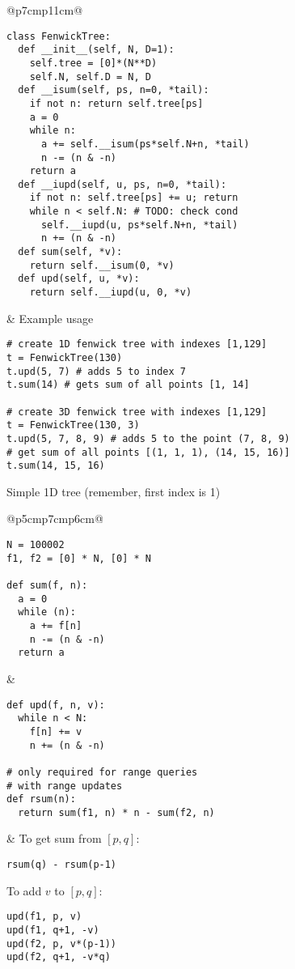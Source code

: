 \documentclass[letterpaper]{article}
\begin{document}
\begin{tabular}{@{}p{7cm}p{11cm}@{}}
    \vspace*{-1em}
    \begin{lstlisting}
class FenwickTree:
  def __init__(self, N, D=1):
    self.tree = [0]*(N**D)
    self.N, self.D = N, D
  def __isum(self, ps, n=0, *tail):
    if not n: return self.tree[ps]
    a = 0
    while n:
      a += self.__isum(ps*self.N+n, *tail)
      n -= (n & -n)
    return a
  def __iupd(self, u, ps, n=0, *tail):
    if not n: self.tree[ps] += u; return
    while n < self.N: # TODO: check cond
      self.__iupd(u, ps*self.N+n, *tail)
      n += (n & -n)
  def sum(self, *v):
    return self.__isum(0, *v)
  def upd(self, u, *v):
    return self.__iupd(u, 0, *v)
\end{lstlisting}
     &
    Example usage

    \begin{lstlisting}
# create 1D fenwick tree with indexes [1,129]
t = FenwickTree(130)
t.upd(5, 7) # adds 5 to index 7
t.sum(14) # gets sum of all points [1, 14]

# create 3D fenwick tree with indexes [1,129]
t = FenwickTree(130, 3)
t.upd(5, 7, 8, 9) # adds 5 to the point (7, 8, 9)
# get sum of all points [(1, 1, 1), (14, 15, 16)]
t.sum(14, 15, 16)
\end{lstlisting}
\end{tabular}

Simple 1D tree (remember, first index is 1)

\begin{tabular}{@{}p{5cm}p{7cm}p{6cm}@{}}
    \vspace*{-1em}
    \begin{lstlisting}
N = 100002
f1, f2 = [0] * N, [0] * N

def sum(f, n):
  a = 0
  while (n):
    a += f[n]
    n -= (n & -n)
  return a
\end{lstlisting}
     &
    \vspace*{-1em}
    \begin{lstlisting}
def upd(f, n, v):
  while n < N:
    f[n] += v
    n += (n & -n)

# only required for range queries
# with range updates
def rsum(n):
  return sum(f1, n) * n - sum(f2, n)
\end{lstlisting}
     &
    To get sum from $[p,q]$:
    \begin{lstlisting}
rsum(q) - rsum(p-1)
\end{lstlisting}

    To add $v$ to $[p,q]$:

    \begin{lstlisting}
upd(f1, p, v)
upd(f1, q+1, -v)
upd(f2, p, v*(p-1))
upd(f2, q+1, -v*q)
\end{lstlisting}
\end{tabular}
\end{document}
